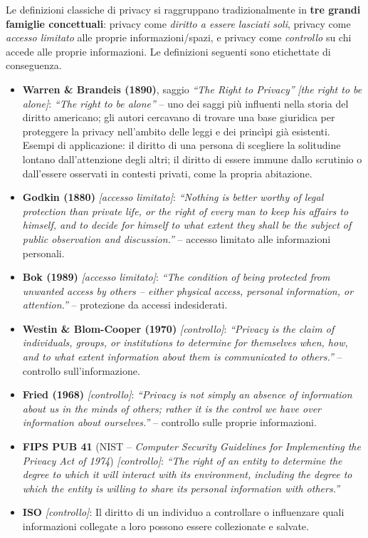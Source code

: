 \documentclass[a4paper,11pt]{article}
\begin{document}
\begin{definizione}
Le definizioni classiche di privacy si raggruppano tradizionalmente in \textbf{tre grandi famiglie concettuali}: privacy come \emph{diritto a essere lasciati soli}, privacy come \emph{accesso limitato} alle proprie informazioni/spazi, e privacy come \emph{controllo} su chi accede alle proprie informazioni. Le definizioni seguenti sono etichettate di conseguenza.

\begin{itemize}
  \item \textbf{Warren \& Brandeis (1890)}, saggio \emph{``The Right to Privacy''} \emph{[the right to be alone]}: \emph{``The right to be alone''} -- uno dei saggi più influenti nella storia del diritto americano; gli autori cercavano di trovare una base giuridica per proteggere la privacy nell'ambito delle leggi e dei princìpi già esistenti. Esempi di applicazione: il diritto di una persona di scegliere la solitudine lontano dall'attenzione degli altri; il diritto di essere immune dallo scrutinio o dall'essere osservati in contesti privati, come la propria abitazione.
  \item \textbf{Godkin (1880)} \emph{[accesso limitato]}: \emph{``Nothing is better worthy of legal protection than private life, or the right of every man to keep his affairs to himself, and to decide for himself to what extent they shall be the subject of public observation and discussion.''} -- accesso limitato alle informazioni personali.
  \item \textbf{Bok (1989)} \emph{[accesso limitato]}: \emph{``The condition of being protected from unwanted access by others -- either physical access, personal information, or attention.''} -- protezione da accessi indesiderati.
  \item \textbf{Westin \& Blom-Cooper (1970)} \emph{[controllo]}: \emph{``Privacy is the claim of individuals, groups, or institutions to determine for themselves when, how, and to what extent information about them is communicated to others.''} -- controllo sull'informazione.
  \item \textbf{Fried (1968)} \emph{[controllo]}: \emph{``Privacy is not simply an absence of information about us in the minds of others; rather it is the control we have over information about ourselves.''} -- controllo sulle proprie informazioni.
  \item \textbf{FIPS PUB 41} (NIST -- \emph{Computer Security Guidelines for Implementing the Privacy Act of 1974}) \emph{[controllo]}: \emph{``The right of an entity to determine the degree to which it will interact with its environment, including the degree to which the entity is willing to share its personal information with others.''}
  \item \textbf{ISO} \emph{[controllo]}: Il diritto di un individuo a controllare o influenzare quali informazioni collegate a loro possono essere collezionate e salvate.
\end{itemize}
\end{definizione}
\end{document}
